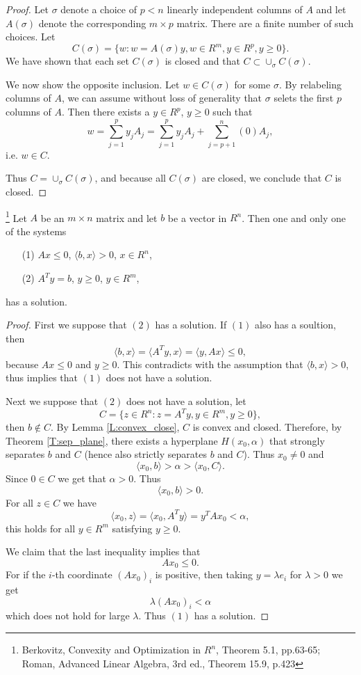 \begin{proof}
Let $\sigma$ denote a choice of $p<n$ linearly independent columns of $A$ and 
let $A(\sigma)$ denote the corresponding $m\times p$ matrix. There are a finite
number of such choices. Let
\[
  C(\sigma) = \{w: w=A(\sigma) y, w\in R^m, y\in R^p, y\ge 0 \}.
\]
We have shown that each set $C(\sigma)$ is closed and that 
$C\subset \cup_{\sigma} C(\sigma)$.

We now show the opposite inclusion. Let $w\in C(\sigma)$ for some $\sigma$. 
By relabeling columns of $A$, we can assume without loss of generality that
$\sigma$ selets the first $p$ columns of $A$. Then there exists a $y\in R^p$,
$y\ge 0$ such that
\[
  w = \sum_{j=1}^p y_j A_j 
    = \sum_{j=1}^p y_j A_j + \sum_{j=p+1}^n (0) A_j,
\]
i.e. $w\in C$.

Thus $C=\cup_{\sigma} C(\sigma)$, and because all $C(\sigma)$ are closed, we
conclude that $C$ is closed.
\end{proof}


\begin{theorem} \label{T:farkas}
\footnote{Berkovitz, Convexity and Optimization in $R^n$, Theorem 5.1, 
          pp.63-65; Roman, Advanced Linear Algebra, 3rd ed., Theorem 15.9, 
          p.423}
Let $A$ be an $m\times n$ matrix and let $b$ be a vector in $R^n$. Then one 
and only one of the systems
\begin{itemize}
  \item[(1)] $Ax\le 0$, $\langle b,x \rangle >0$, $x\in R^n$,
  \item[(2)] $A^T y=b$, $y\ge 0$, $y\in R^m$,
\end{itemize}
has a solution.
\end{theorem}
\begin{proof}
First we suppose that $(2)$ has a solution. If $(1)$ also has a soultion, then
\[
  \langle b,x \rangle = \langle A^T y, x \rangle = \langle y,Ax \rangle \le 0,
\]
because $Ax\le 0$ and $y\ge 0$. This contradicts with the assumption that
$\langle b,x \rangle >0$, thus implies that $(1)$ does not have a solution.

Next we suppose that $(2)$ does not have a solution, let
\[
  C=\{z\in R^n: z=A^T y, y\in R^m, y\ge 0 \},
\]
then $b\notin C$. By Lemma \ref{L:convex_close}, $C$ is convex and closed. 
Therefore, by Theorem \ref{T:sep_plane}, there exists a hyperplane 
$H(x_0,\alpha)$ that strongly separates $b$ and $C$ (hence also strictly 
separates $b$ and $C$). Thus $x_0\neq 0$ and
\[
  \langle x_0,b \rangle > \alpha > \langle x_0,C \rangle.
\]
Since $0\in C$ we get that $\alpha>0$. Thus 
\[
  \langle x_0,b \rangle >0.
\]
For all $z\in C$ we have
\[
  \langle x_0,z \rangle = \langle x_0,A^T y \rangle = y^T Ax_0 < \alpha,
\]
this holds for all $y\in R^m$ satisfying $y\ge 0$.

We claim that the last inequality implies that 
\[
  Ax_0 \le 0. 
\]
For if the $i$-th coordinate $(Ax_0)_i$ is positive, then taking 
$y=\lambda e_i$ for $\lambda>0$ we get
\[
  \lambda (Ax_0)_i < \alpha
\]
which does not hold for large $\lambda$. Thus $(1)$ has a solution.
\end{proof}

